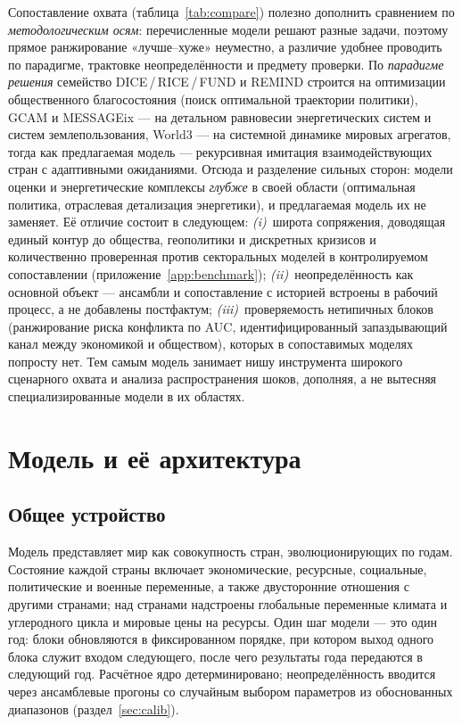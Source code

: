 \documentclass[11pt,a4paper]{article}
\begin{document}
Сопоставление охвата (таблица~\ref{tab:compare}) полезно дополнить сравнением по
\emph{методологическим осям}: перечисленные модели решают разные задачи, поэтому прямое
ранжирование «лучше--хуже» неуместно, а различие удобнее проводить по парадигме, трактовке
неопределённости и предмету проверки. По \emph{парадигме решения} семейство DICE\,/\,RICE\,/\,FUND
и REMIND строится на оптимизации общественного благосостояния (поиск оптимальной траектории
политики), GCAM и MESSAGEix --- на детальном равновесии энергетических систем и систем землепользования, World3 --- на системной динамике мировых агрегатов, тогда как предлагаемая модель ---
рекурсивная имитация взаимодействующих стран с адаптивными ожиданиями. Отсюда и разделение
сильных сторон: модели оценки и энергетические комплексы \emph{глубже} в своей области
(оптимальная политика, отраслевая детализация энергетики), и предлагаемая модель их не заменяет.
Её отличие состоит в следующем: \emph{(i)}~широта сопряжения, доводящая
единый контур до общества, геополитики и дискретных кризисов и количественно проверенная
против секторальных моделей в контролируемом сопоставлении (приложение~\ref{app:benchmark});
\emph{(ii)}~неопределённость как основной объект --- ансамбли и сопоставление с историей встроены в рабочий процесс, а не
добавлены постфактум; \emph{(iii)}~проверяемость нетипичных блоков (ранжирование риска конфликта
по AUC, идентифицированный запаздывающий канал между экономикой и обществом), которых в
сопоставимых моделях попросту нет. Тем самым модель занимает нишу инструмента широкого
сценарного охвата и анализа распространения шоков, дополняя, а не вытесняя специализированные
модели в их областях.

\section{Модель и её архитектура}

\subsection{Общее устройство}

Модель представляет мир как совокупность стран, эволюционирующих по годам. Состояние
каждой страны включает экономические, ресурсные, социальные, политические и военные
переменные, а также двусторонние отношения с другими странами; над странами надстроены
глобальные переменные климата и углеродного цикла и мировые цены на ресурсы. Один шаг
модели --- это один год: блоки обновляются в фиксированном порядке, при котором выход
одного блока служит входом следующего, после чего результаты года передаются в
следующий год. Расчётное ядро детерминировано; неопределённость вводится через
ансамблевые прогоны со случайным выбором параметров из обоснованных диапазонов
(раздел~\ref{sec:calib}).
\end{document}
